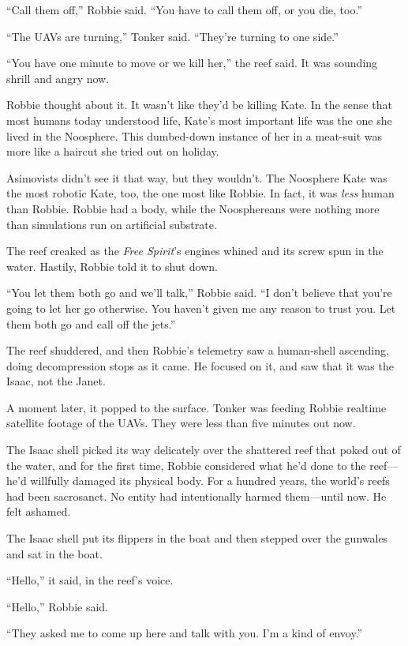 “Call them off,” Robbie said. “You have to call them off, or you
die, too.”

“The UAVs are turning,” Tonker said. “They’re turning to one
side.”

“You have one minute to move or we kill her,” the reef said. It was
sounding shrill and angry now.

Robbie thought about it. It wasn’t like they’d be killing Kate. In
the sense that most humans today understood life, Kate’s most
important life was the one she lived in the Noosphere. This
dumbed-down instance of her in a meat-suit was more like a haircut
she tried out on holiday.

Asimovists didn’t see it that way, but they wouldn’t. The Noosphere
Kate was the most robotic Kate, too, the one most like Robbie. In
fact, it was \emph{less} human than Robbie. Robbie had a body,
while the Noosphereans were nothing more than simulations run on
artificial substrate.

The reef creaked as the \emph{Free Spirit}’s engines whined and its
screw spun in the water. Hastily, Robbie told it to shut down.

“You let them both go and we’ll talk,” Robbie said. “I don’t
believe that you’re going to let her go otherwise. You haven’t
given me any reason to trust you. Let them both go and call off the
jets.”

The reef shuddered, and then Robbie’s telemetry saw a human-shell
ascending, doing decompression stops as it came. He focused on it,
and saw that it was the Isaac, not the Janet.

A moment later, it popped to the surface. Tonker was feeding Robbie
realtime satellite footage of the UAVs. They were less than five
minutes out now.

The Isaac shell picked its way delicately over the shattered reef
that poked out of the water, and for the first time, Robbie
considered what he’d done to the reef—he’d willfully damaged its
physical body. For a hundred years, the world’s reefs had been
sacrosanct. No entity had intentionally harmed them—until now. He
felt ashamed.

The Isaac shell put its flippers in the boat and then stepped over
the gunwales and sat in the boat.

“Hello,” it said, in the reef’s voice.

“Hello,” Robbie said.

“They asked me to come up here and talk with you. I’m a kind of
envoy.”

